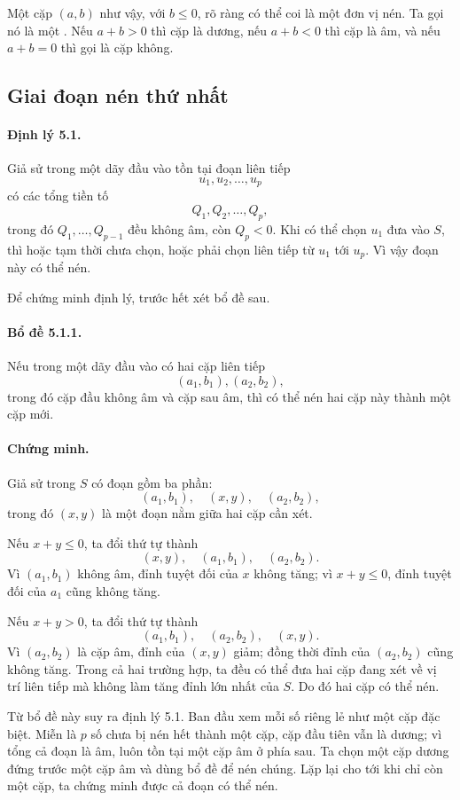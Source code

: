 \documentclass[11pt]{article}
\begin{document}
Một cặp $(a,b)$ như vậy, với $b\le 0$, rõ ràng có thể coi là một đơn vị nén.
Ta gọi nó là một . Nếu $a+b>0$ thì cặp là dương, nếu $a+b<0$ thì
cặp là âm, và nếu $a+b=0$ thì gọi là cặp không.

\subsection{Giai đoạn nén thứ nhất}

\paragraph{Định lý 5.1.}
Giả sử trong một dãy đầu vào tồn tại đoạn liên tiếp
\[
  u_1,u_2,\ldots,u_p
\]
có các tổng tiền tố
\[
  Q_1,Q_2,\ldots,Q_p,
\]
trong đó $Q_1,\ldots,Q_{p-1}$ đều không âm, còn $Q_p<0$. Khi có thể chọn
$u_1$ đưa vào $S$, thì hoặc tạm thời chưa chọn, hoặc phải chọn liên tiếp từ
$u_1$ tới $u_p$. Vì vậy đoạn này có thể nén.

Để chứng minh định lý, trước hết xét bổ đề sau.

\paragraph{Bổ đề 5.1.1.}
Nếu trong một dãy đầu vào có hai cặp liên tiếp
\[
  (a_1,b_1),(a_2,b_2),
\]
trong đó cặp đầu không âm và cặp sau âm, thì có thể nén hai cặp này thành một
cặp mới.

\paragraph{Chứng minh.}
Giả sử trong $S$ có đoạn gồm ba phần:
\[
  (a_1,b_1),\quad (x,y),\quad (a_2,b_2),
\]
trong đó $(x,y)$ là một đoạn nằm giữa hai cặp cần xét.

Nếu $x+y\le 0$, ta đổi thứ tự thành
\[
  (x,y),\quad (a_1,b_1),\quad (a_2,b_2).
\]
Vì $(a_1,b_1)$ không âm, đỉnh tuyệt đối của $x$ không tăng; vì $x+y\le 0$,
đỉnh tuyệt đối của $a_1$ cũng không tăng.

Nếu $x+y>0$, ta đổi thứ tự thành
\[
  (a_1,b_1),\quad (a_2,b_2),\quad (x,y).
\]
Vì $(a_2,b_2)$ là cặp âm, đỉnh của $(x,y)$ giảm; đồng thời đỉnh của
$(a_2,b_2)$ cũng không tăng. Trong cả hai trường hợp, ta đều có thể đưa hai
cặp đang xét về vị trí liên tiếp mà không làm tăng đỉnh lớn nhất của $S$.
Do đó hai cặp có thể nén.

Từ bổ đề này suy ra định lý 5.1. Ban đầu xem mỗi số riêng lẻ như một cặp đặc
biệt. Miễn là $p$ số chưa bị nén hết thành một cặp, cặp đầu tiên vẫn là dương;
vì tổng cả đoạn là âm, luôn tồn tại một cặp âm ở phía sau. Ta chọn một cặp
dương đứng trước một cặp âm và dùng bổ đề để nén chúng. Lặp lại cho tới khi
chỉ còn một cặp, ta chứng minh được cả đoạn có thể nén.
\end{document}
